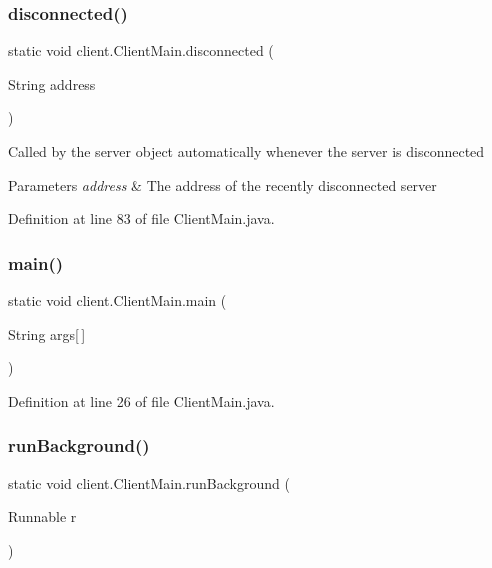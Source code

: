 \subsubsection{\texorpdfstring{disconnected()}{disconnected()}}
{\footnotesize\ttfamily static void client.\+Client\+Main.\+disconnected (\begin{DoxyParamCaption}\item[{String}]{address }\end{DoxyParamCaption})\hspace{0.3cm}{\ttfamily [static]}}

Called by the {\ttfamily server} object automatically whenever the server is disconnected


\begin{DoxyParams}{Parameters}
{\em address} & The address of the recently disconnected server \\
\hline
\end{DoxyParams}


Definition at line 83 of file Client\+Main.\+java.

\hypertarget{classclient_1_1_client_main_a1c318ff544d49e68acce0aeac5446336}{}\label{classclient_1_1_client_main_a1c318ff544d49e68acce0aeac5446336} 
\subsubsection{\texorpdfstring{main()}{main()}}
{\footnotesize\ttfamily static void client.\+Client\+Main.\+main (\begin{DoxyParamCaption}\item[{String}]{args\mbox{[}$\,$\mbox{]} }\end{DoxyParamCaption})\hspace{0.3cm}{\ttfamily [static]}}



Definition at line 26 of file Client\+Main.\+java.

\hypertarget{classclient_1_1_client_main_afb84263c3e741a3f35611ef1b28b838e}{}\label{classclient_1_1_client_main_afb84263c3e741a3f35611ef1b28b838e} 
\subsubsection{\texorpdfstring{run\+Background()}{runBackground()}\hspace{0.1cm}{\footnotesize\ttfamily [1/2]}}
{\footnotesize\ttfamily static void client.\+Client\+Main.\+run\+Background (\begin{DoxyParamCaption}\item[{Runnable}]{r }\end{DoxyParamCaption})\hspace{0.3cm}{\ttfamily [static]}}

